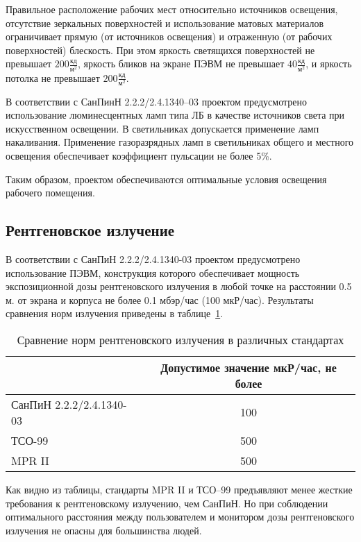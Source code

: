 Правильное расположение рабочих мест относительно источников освещения, отсутствие зеркальных поверхностей и использование матовых материалов ограничивает прямую (от источников освещения) и отраженную (от рабочих поверхностей) блескость. При  этом яркость светящихся поверхностей не превышает $200 \frac{\text{кд}}{\text{м}^2}$, яркость бликов на экране ПЭВМ не превышает $40 \frac{\text{кд}}{\text{м}^2}$, и яркость потолка не превышает $200 \frac{\text{кд}}{\text{м}^2}$.

В соответствии с СанПинН 2.2.2/2.4.1340--03 проектом предусмотрено использование люминесцентных ламп типа ЛБ в качестве источников света при искусственном освещении. В светильниках допускается применение ламп накаливания. Применение газоразрядных ламп в светильниках общего и местного освещения обеспечивает коэффициент пульсации не более 5\%.

Таким образом, проектом обеспечиваются оптимальные условия освещения рабочего помещения.

\subsection{Рентгеновское излучение}

В соответствии с СанПиН 2.2.2/2.4.1340-03 проектом предусмотрено использование ПЭВМ, конструкция которого обеспечивает мощность экспозиционной дозы рентгеновского излучения в любой точке на расстоянии 0.5 м. от экрана и корпуса не более 0.1 мбэр/час (100 мкР/час). Результаты сравнения норм излучения приведены в таблице~\ref{tab:rentgen}.

\begin{table}[ht]
\caption{Сравнение норм рентгеновского излучения в различных стандартах}
\begin{tabular}{|l|c|}
\hline
& Допустимое значение мкР/час, не более \\
\hline
СанПиН 2.2.2/2.4.1340-03 & 100 \\
\hline
ТСО-99 & 500 \\
\hline
MPR II & 500\\
\hline
\end{tabular}
\label{tab:rentgen}
\end{table}

Как видно из таблицы, стандарты MPR II и ТСО--99 предъявляют менее жесткие требования к рентгеновскому излучению, чем СанПиН. Но при соблюдении оптимального расстояния между пользователем и монитором дозы рентгеновского излучения не опасны для большинства людей.

